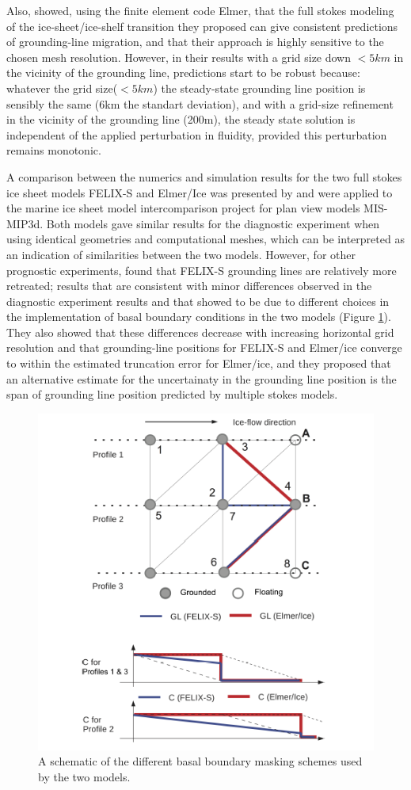 \documentclass[a4paper,12pt]{article}
\begin{document}
Also, \cite{durand2009full} showed, using the finite element code Elmer, that the full stokes modeling of the ice-sheet/ice-shelf transition they proposed can give consistent predictions of grounding-line migration, and that their approach is highly sensitive to the chosen mesh resolution. However, in their results with a grid size down $<5 km$ in the vicinity of the grounding line, predictions start to be robust because: whatever the grid size($<5km$) the steady-state grounding line position is sensibly the same (6km the standart deviation), and with a grid-size refinement in the vicinity of the grounding line (200m), the steady state solution is independent of the applied perturbation in fluidity, provided this perturbation remains monotonic.

A comparison between the numerics and simulation results for the two full stokes ice sheet models FELIX-S \cite[]{leng2012parallel} and Elmer/Ice \cite[]{gagliardini2013capabilities} was presented by \cite{zhang2017comparison} and were applied to the marine ice sheet model intercomparison project for plan view models MIS-MIP3d. Both models gave similar results for the diagnostic experiment when using identical geometries and computational meshes, which can be interpreted as an indication of similarities between the two models. However, for other prognostic experiments, \cite{zhang2017comparison} found that FELIX-S grounding lines are relatively more retreated; results that are consistent with minor differences observed in the diagnostic experiment results and that \cite{zhang2017comparison} showed to be due to different choices in the implementation of basal boundary conditions in the two models (Figure \ref{comparison}). They also showed that these differences decrease with increasing horizontal grid resolution and that grounding-line positions for FELIX-S and Elmer/ice converge to within the estimated truncation error for Elmer/ice, and they proposed that an alternative estimate for the uncertainaty in the grounding line position is the span of grounding line position predicted by multiple stokes models. 

\begin{figure}[!h]
	\centering
	\includegraphics[width=0.7\linewidth]{../fig/comparison}
	\caption{A schematic of the different basal boundary masking schemes used by the two models.}
	\label{comparison}
\end{figure}
\end{document}
